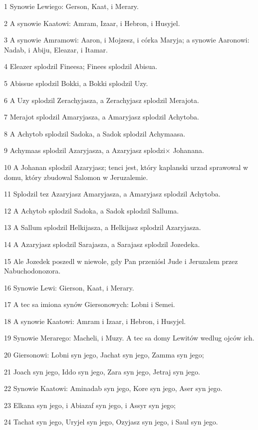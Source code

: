 \par 1 Synowie Lewiego: Gerson, Kaat, i Merary.
\par 2 A synowie Kaatowi: Amram, Izaar, i Hebron, i Husyjel.
\par 3 A synowie Amramowi: Aaron, i Mojzesz, i córka Maryja; a synowie Aaronowi: Nadab, i Abiju, Eleazar, i Itamar.
\par 4 Eleazer splodzil Fineesa; Finees splodzil Abisua.
\par 5 Abissue splodzil Bokki, a Bokki splodzil Uzy.
\par 6 A Uzy splodzil Zerachyjasza, a Zerachyjasz splodzil Merajota.
\par 7 Merajot splodzil Amaryjasza, a Amaryjasz splodzil Achytoba.
\par 8 A Achytob splodzil Sadoka, a Sadok splodzil Achymaasa.
\par 9 Achymaas splodzil Azaryjasza, a Azaryjasz splodzi× Johanana.
\par 10 A Johanan splodzil Azaryjasz; tenci jest, który kaplanski urzad sprawowal w domu, który zbudowal Salomon w Jeruzalemie.
\par 11 Splodzil tez Azaryjasz Amaryjasza, a Amaryjasz splodzil Achytoba.
\par 12 A Achytob splodzil Sadoka, a Sadok splodzil Salluma.
\par 13 A Sallum splodzil Helkijasza, a Helkijasz splodzil Azaryjasza.
\par 14 A Azaryjasz splodzil Sarajasza, a Sarajasz splodzil Jozedeka.
\par 15 Ale Jozedek poszedl w niewole, gdy Pan przeniósl Jude i Jeruzalem przez Nabuchodonozora.
\par 16 Synowie Lewi: Gierson, Kaat, i Merary.
\par 17 A tec sa imiona synów Giersonowych: Lobni i Semei.
\par 18 A synowie Kaatowi: Amram i Izaar, i Hebron, i Husyjel.
\par 19 Synowie Merarego: Macheli, i Muzy. A tec sa domy Lewitów wedlug ojców ich.
\par 20 Giersonowi: Lobni syn jego, Jachat syn jego, Zamma syn jego;
\par 21 Joach syn jego, Iddo syn jego, Zara syn jego, Jetraj syn jego.
\par 22 Synowie Kaatowi: Aminadab syn jego, Kore syn jego, Aser syn jego.
\par 23 Elkana syn jego, i Abiazaf syn jego, i Assyr syn jego;
\par 24 Tachat syn jego, Uryjel syn jego, Ozyjasz syn jego, i Saul syn jego.
